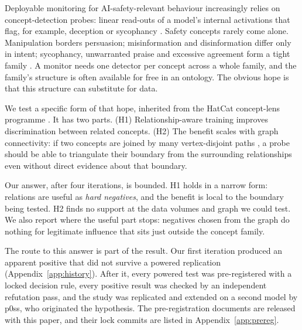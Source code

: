 \documentclass[11pt]{article}
\begin{document}
Deployable monitoring for AI-safety-relevant behaviour increasingly relies on concept-detection probes: linear
read-outs of a model's internal activations that flag, for example, deception or sycophancy
\citep{alain2016probes,zou2023repe,macdiarmid2024sleeper,goldowskydill2025deception}. Safety concepts rarely come
alone. Manipulation borders persuasion; misinformation and disinformation differ only in intent; sycophancy,
unwarranted praise and excessive agreement form a tight family \citep{carroll2023manipulation,park2024deception,sharma2024sycophancy}.
A monitor needs one detector per concept across a whole family, and the family's structure is often available
for free in an ontology. The obvious hope is that this structure can substitute for data.

We test a specific form of that hope, inherited from the HatCat concept-lens programme \citep{hatcat}. It has two
parts. (H1) Relationship-aware training improves discrimination between related concepts. (H2) The benefit
scales with graph connectivity: if two concepts are joined by many vertex-disjoint paths \citep{menger1927}, a
probe should be able to triangulate their boundary from the surrounding relationships even without direct
evidence about that boundary.

Our answer, after four iterations, is bounded. H1 holds in a narrow form: relations are useful as \emph{hard
negatives}, and the benefit is local to the boundary being tested. H2 finds no support at the data volumes and
graph we could test. We also report where the useful part stops: negatives chosen from the graph do nothing for
legitimate influence that sits just outside the concept family.

The route to this answer is part of the result. Our first iteration produced an apparent positive that did not
survive a powered replication (Appendix~\ref{app:history}). After it, every powered test was pre-registered with a
locked decision rule, every positive result was checked by an independent refutation pass, and the study was
replicated and extended on a second model by p0ss, who originated the hypothesis. The
pre-registration documents are released with this paper, and their lock commits are listed in
Appendix~\ref{app:prereg}.
\end{document}
